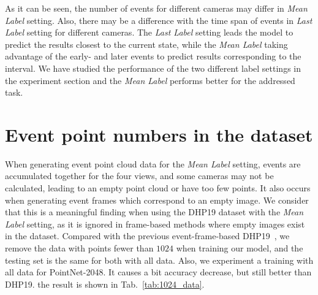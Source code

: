 \documentclass[10pt,twocolumn,letterpaper]{article}
\begin{document}
As it can be seen, the number of events for different cameras may differ in \emph{Mean Label} setting. Also, there may be a difference with the time span of events in \emph{Last Label} setting for different cameras.  The \emph{Last Label} setting leads the model to predict the results closest to the current state, while the \emph{Mean Label} taking advantage of the early- and later events to predict results corresponding to the interval. We have studied the performance of the two different label settings in the experiment section and the \emph{Mean Label} performs better for the addressed task.

\section{Event point numbers in the dataset}
When generating event point cloud data for the \emph{Mean Label} setting, events are accumulated together for the four views, and some cameras may not be calculated, leading to an empty point cloud or have too few points.
It also occurs when generating event frames which correspond to an empty image.
We consider that this is a meaningful finding when using the DHP19 dataset with the \emph{Mean Label} setting, as it is ignored in frame-based methods where empty images exist in the dataset. Compared with the previous event-frame-based DHP19~\cite{calabrese2019dhp19}, we remove the data with points fewer than $1024$ when training our model, and the testing set is the same for both with all data. Also, we experiment a training with all data for PointNet-2048. It causes a bit accuracy decrease, but still better than DHP19.
the result is shown in Tab.~\ref{tab:1024_data}.
\begin{table}[h]
\renewcommand\thetable{B}
\footnotesize
   \centering
         \caption{Ablation experiment on training data.}
\label{tab:1024_data}
\end{table}
\end{document}
